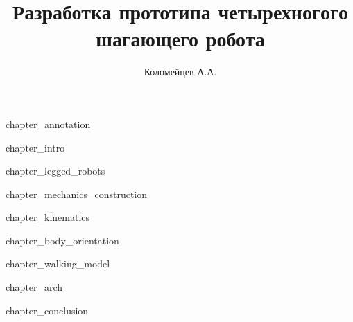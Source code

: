 \documentclass[a4paper,14pt,russian]{extreport}
\author{Коломейцев А.А.}
\title{Разработка прототипа четырехногого шагающего робота}
\affil{НИУ "МЭИ"}
\newcommand{\includechapter}[1]{{chapter_#1}\newpage}
\newcommand{\includeappend}[1]{{append_#1}\newpage}
\newcommand{\includebiblio}[1]{
    \begingroup
    \renewcommand{\chapter}[2]{
        \clearpage
        \stepcounter{chapter}
        \centering\paragraph{\MakeUppercase{Библиографический список}}
        \addcontentsline{toc}{likechapter}{\MakeUppercase{Библиографический список}}
    }
    \let\bibfont\protect\normalsize
    
    \endgroup
}
\newcommand{\append}[1]{
    \clearpage
    \stepcounter{chapter}
    \begin{center}
        \paragraph{\MakeUppercase{\chaptertitlename~\Asbuk{chapter}}}
        \vspace{-0.5cm}
        \paragraph{\MakeUppercase{ #1}}
    \end{center}
    \addcontentsline{toc}{likechapter}{\MakeUppercase{\chaptertitlename~\Asbuk{chapter}: #1}}
}
\begin{document}
\maketitle
\newpage

\includechapter{annotation} %

\tableofcontents\newpage

\includechapter{intro} %

\includechapter{legged_robots}

\includechapter{mechanics_construction}

\includechapter{kinematics}

\includechapter{body_orientation}

\includechapter{walking_model}

\includechapter{arch}

\includechapter{conclusion}


\includebiblio{sources} %


\appendix


% 
\end{document}

